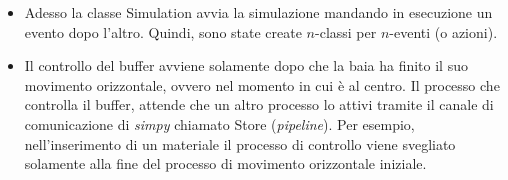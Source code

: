 \documentclass[a4paper]{article}
\begin{document}
\begin{itemize}[label=]
		\item Adesso la classe \textsf{Simulation} avvia la simulazione mandando in esecuzione un evento dopo l'altro. Quindi, sono state create $n$-classi per $n$-eventi (o azioni).
		
		\item Il controllo del \textsf{buffer} avviene solamente dopo che la baia ha finito il suo movimento orizzontale, ovvero nel momento in cui è al centro. Il processo che controlla il buffer, attende che un altro processo lo attivi tramite il canale di comunicazione di \emph{simpy} chiamato \textsf{Store} (\emph{pipeline}). Per esempio, nell'inserimento di un materiale il processo di controllo viene svegliato solamente alla fine del processo di movimento orizzontale iniziale.
	\end{itemize}
\end{document}
